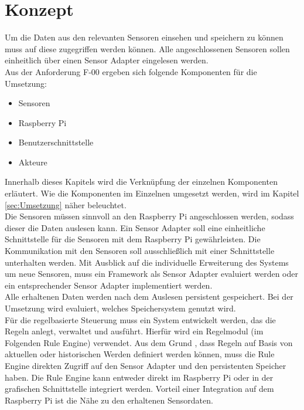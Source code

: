 \section{Konzept}
Um die Daten aus den relevanten Sensoren einsehen und speichern zu können muss auf diese zugegriffen werden können. Alle angeschlossenen Sensoren sollen einheitlich über einen Sensor Adapter eingelesen werden.\\
Aus der Anforderung F-00 ergeben sich folgende Komponenten für die Umsetzung:
\begin{itemize}
	\item Sensoren
	\item Raspberry Pi
	\item Benutzerschnittstelle
	\item Akteure
\end{itemize}
Innerhalb dieses Kapitels wird die Verknüpfung der einzelnen Komponenten erläutert. Wie die Komponenten im Einzelnen umgesetzt werden, wird im Kapitel \ref{sec:Umsetzung} näher beleuchtet.\\
Die Sensoren müssen sinnvoll an den Raspberry Pi angeschlossen werden, sodass dieser die Daten auslesen kann. Ein Sensor Adapter soll eine einheitliche Schnittstelle für die Sensoren mit dem Raspberry Pi gewährleisten. Die Kommunikation mit den Sensoren soll ausschließlich mit einer Schnittstelle unterhalten werden. Mit Ausblick auf die individuelle Erweiterung des Systems um neue Sensoren, muss ein Framework als Sensor Adapter evaluiert werden oder ein entsprechender Sensor Adapter implementiert werden.\\
Alle erhaltenen Daten werden nach dem Auslesen persistent gespeichert. Bei der Umsetzung wird evaluiert, welches Speichersystem genutzt wird.\\
Für die regelbasierte Steuerung muss ein System entwickelt werden, das die Regeln anlegt, verwaltet und ausführt. Hierfür wird ein Regelmodul (im Folgenden Rule Engine) verwendet. Aus dem Grund , dass Regeln auf Basis von aktuellen oder historischen Werden definiert werden können, muss die Rule Engine direkten Zugriff auf den Sensor Adapter und den persistenten Speicher haben. Die Rule Engine kann entweder direkt im Raspberry Pi oder in der grafischen Schnittstelle integriert werden. Vorteil einer Integration auf dem Raspberry Pi ist die Nähe zu den erhaltenen Sensordaten.\\
